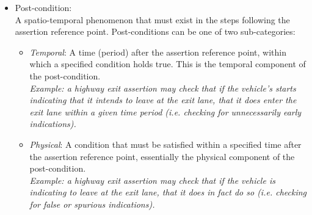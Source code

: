 \begin{itemize}
\begin{itemize}
    \end{itemize}
    \item Post-condition: \\
    A spatio-temporal phenomenon that must exist in the steps following the assertion reference point. Post-conditions can be one of two sub-categories:
    \begin{itemize}
        \item \textit{Temporal}: A time (period) after the assertion reference point, within which a specified condition holds true. This is the temporal component of the post-condition.\\
        \textit{Example: a highway exit assertion may check that if the vehicle's starts indicating that it intends to leave at the exit lane, that it does enter the exit lane within a given time period (i.e. checking for unnecessarily early indications).}
        \item \textit{Physical}: A condition that must be satisfied within a specified time after the assertion reference point, essentially the physical component of the post-condition.\\
        \textit{Example: a highway exit  assertion may check that if the vehicle is indicating to leave at the exit lane, that it does in fact do so (i.e. checking for false or spurious indications).}
    \end{itemize}
\end{itemize}

